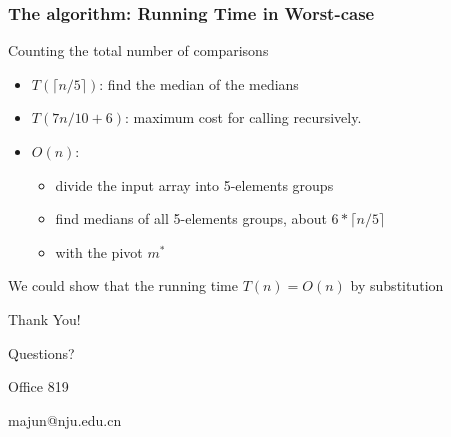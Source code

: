 \documentclass[UTF8,11pt,handout]{beamer}
\begin{document}
\begin{frame}
\frametitle{The  algorithm: Running Time in Worst-case}
\begin{block}{Counting the total number of comparisons}
	\begin{center}
		\begin{itemize}
			\item {\color{green!90!black!90!}$T(\lceil n/5\rceil)$}: find the median of the medians
			\item {\color{blue!90!black!90!}$T(7n/10+6)$}: maximum cost for   calling  recursively.
			\item {\color{red!90!black!90!}$O(n)$}:
			\begin{itemize}
				\item divide the input array into  5-elements groups
				\item find medians of all 5-elements groups, about $6*\lceil n/5\rceil$
				\item {} with the pivot $m^*$
			\end{itemize}
		\end{itemize}
	\end{center}
\end{block}
\begin{block}{We could show that the running time {\color{red}$T(n)=O(n)$} by substitution}
\end{block}
\end{frame}
\begin{frame}
	\begin{block}{
		\begin{center}
		{\huge
			Thank You!
			
			\textcolor[rgb]{1,0,0}	{Questions?}
		}
		\end{center}
	}
	\end{block}
	\begin{block}{}
		\begin{center}
		
			Office 819
			
			majun@nju.edu.cn
		\end{center}
	\end{block}
	\end{frame}
\end{document}
